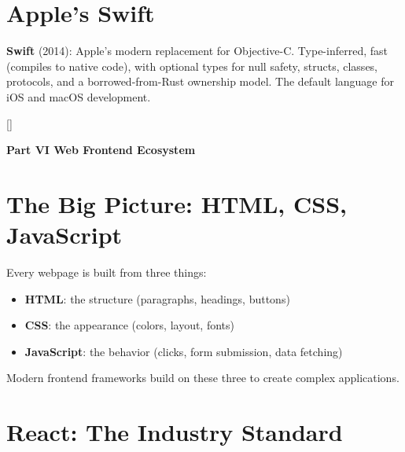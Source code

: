 \documentclass[11pt, letterpaper]{article}
\newcommand{\orangesections}{%
  \titleformat{\section}{\large\bfseries\color{sectionorange}}{}{0em}{}[\color{sectionorange}\titlerule]%
  \titleformat{\subsection}{\normalsize\bfseries\color{sectionorange!80!black}}{}{0em}{}%
}
\newcommand{\partbanner}[3]{%
  \begin{tcolorbox}[colback=#1, colframe=#2, boxrule=1.2pt, arc=4pt,
    left=8pt, right=8pt, top=6pt, bottom=6pt]
    \begin{center}{\LARGE\bfseries #3}\end{center}
  \end{tcolorbox}%
}
\begin{document}
\section*{Apple's Swift}

\textbf{Swift} (2014): Apple's modern replacement for Objective-C. Type-inferred, fast (compiles to native code), with optional types for null safety, structs, classes, protocols, and a borrowed-from-Rust ownership model. The default language for iOS and macOS development.

\newpage

\orangesections
{}
\partbanner{part4bg}{sectionorange}{Part VI \quad Web Frontend Ecosystem}

\vspace{8pt}

\section*{The Big Picture: HTML, CSS, JavaScript}

Every webpage is built from three things:
\begin{itemize}[noitemsep]
  \item \textbf{HTML}: the structure (paragraphs, headings, buttons)
  \item \textbf{CSS}: the appearance (colors, layout, fonts)
  \item \textbf{JavaScript}: the behavior (clicks, form submission, data fetching)
\end{itemize}

Modern frontend frameworks build on these three to create complex applications.

\section*{React: The Industry Standard}
\end{document}
